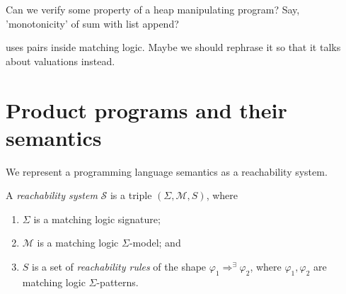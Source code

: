 \documentclass{article}
\begin{document}
Can we verify some property of a heap manipulating program? Say, 'monotonicity' of sum with list append?


 uses pairs inside matching logic. Maybe we should rephrase it so that it talks about valuations instead.

\section{Product programs and their semantics}
We represent a programming language semantics as a reachability system.
\begin{definition}\label{def:RLsystem}
A \emph{reachability system} $\mathcal{S}$ is a triple $(\Sigma, \mathcal{M}, S)$, where
\begin{enumerate}
    \item $\Sigma$ is a matching logic signature;
    \item $\mathcal{M}$ is a matching logic $\Sigma$-model; and
    \item $S$ is a set of \emph{reachability rules} of the shape
    $\varphi_1 \Rightarrow^\exists \varphi_2$, where $\varphi_1,\varphi_2$ are matching logic $\Sigma$-patterns.
\end{enumerate}
\end{definition}
\end{document}
